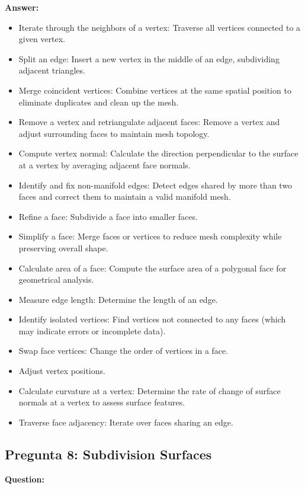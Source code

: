 \documentclass{article}
\begin{document}
\textbf{Answer:}

\begin{itemize}
    \item Iterate through the neighbors of a vertex: Traverse all vertices connected to a given vertex.
    \item Split an edge: Insert a new vertex in the middle of an edge, subdividing adjacent triangles.
    \item Merge coincident vertices: Combine vertices at the same spatial position to eliminate duplicates and clean up the mesh.
    \item Remove a vertex and retriangulate adjacent faces: Remove a vertex and adjust surrounding faces to maintain mesh topology.
    \item Compute vertex normal: Calculate the direction perpendicular to the surface at a vertex by averaging adjacent face normals.
    \item Identify and fix non-manifold edges: Detect edges shared by more than two faces and correct them to maintain a valid manifold mesh.
    \item Refine a face: Subdivide a face into smaller faces.
    \item Simplify a face: Merge faces or vertices to reduce mesh complexity while preserving overall shape.
    \item Calculate area of a face: Compute the surface area of a polygonal face for geometrical analysis.
    \item Measure edge length: Determine the length of an edge.
    \item Identify isolated vertices: Find vertices not connected to any faces (which may indicate errors or incomplete data).
    \item Swap face vertices: Change the order of vertices in a face.
    \item Adjust vertex positions.
    \item Calculate curvature at a vertex: Determine the rate of change of surface normals at a vertex to assess surface features.
    \item Traverse face adjacency: Iterate over faces sharing an edge.
\end{itemize}

\subsection{Pregunta 8: Subdivision Surfaces}

\textbf{Question:} 
\end{document}

